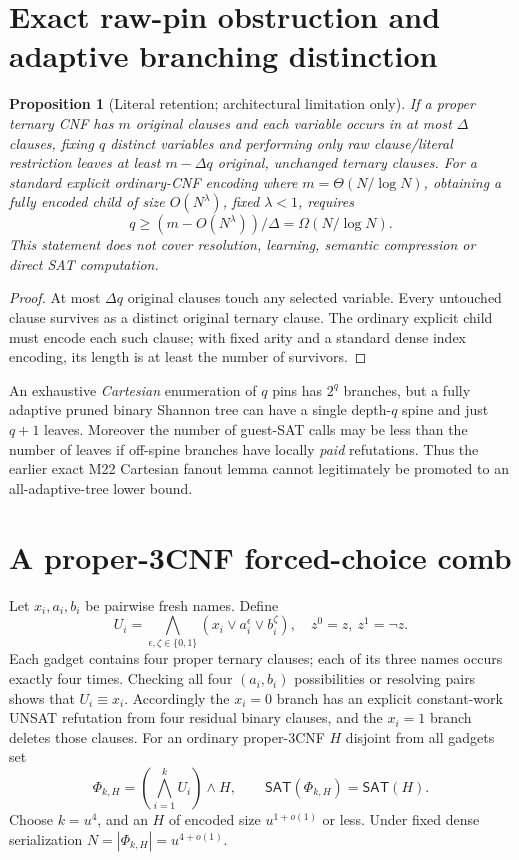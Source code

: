\documentclass[11pt]{article}
\newtheorem{proposition}[theorem]{Proposition}
\newcommand{\SAT}{\mathsf{SAT}}
\begin{document}
\section{Exact raw-pin obstruction and adaptive branching distinction}
\begin{proposition}[Literal retention; architectural limitation only]
If a proper ternary CNF has $m$ original clauses and each variable occurs in at most $\Delta$ clauses, fixing $q$ distinct variables and performing only raw clause/literal restriction leaves at least $m-\Delta q$ original, unchanged ternary clauses. For a standard explicit ordinary-CNF encoding where $m=\Theta(N/\log N)$, obtaining a fully encoded child of size $O(N^\lambda)$, fixed $\lambda<1$, requires
\[
q\ge (m-O(N^\lambda))/\Delta=\Omega(N/\log N).
\]
This statement does not cover resolution, learning, semantic compression or direct SAT computation.
\end{proposition}
\begin{proof}
At most $\Delta q$ original clauses touch any selected variable. Every untouched clause survives as a distinct original ternary clause. The ordinary explicit child must encode each such clause; with fixed arity and a standard dense index encoding, its length is at least the number of survivors.
\end{proof}
An exhaustive \emph{Cartesian} enumeration of $q$ pins has $2^q$ branches, but a fully adaptive pruned binary Shannon tree can have a single depth-$q$ spine and just $q+1$ leaves. Moreover the number of guest-SAT calls may be less than the number of leaves if off-spine branches have locally \emph{paid} refutations. Thus the earlier exact M22 Cartesian fanout lemma cannot legitimately be promoted to an all-adaptive-tree lower bound.

\section{A proper-3CNF forced-choice comb}
Let $x_i,a_i,b_i$ be pairwise fresh names. Define
\[
 U_i=\bigwedge_{\epsilon,\zeta\in\{0,1\}}
(x_i\vee a_i^\epsilon\vee b_i^\zeta),
\quad z^0=z,\ z^1=\neg z.
\]
Each gadget contains four proper ternary clauses; each of its three names occurs exactly four times. Checking all four $(a_i,b_i)$ possibilities or resolving pairs shows that $U_i\equiv x_i$. Accordingly the $x_i=0$ branch has an explicit constant-work UNSAT refutation from four residual binary clauses, and the $x_i=1$ branch deletes those clauses. For an ordinary proper-3CNF $H$ disjoint from all gadgets set
\[
 \Phi_{k,H}=\left(\bigwedge_{i=1}^k U_i\right)\wedge H,
\qquad \SAT(\Phi_{k,H})=\SAT(H).
\]
Choose $k=u^4$, and an $H$ of encoded size $u^{1+o(1)}$ or less. Under fixed dense serialization $N=|\Phi_{k,H}|=u^{4+o(1)}$.
\end{document}
